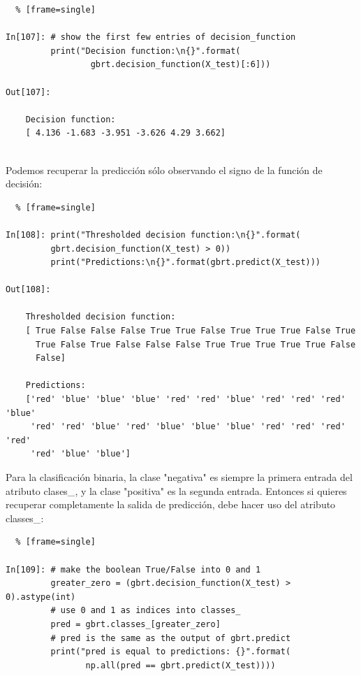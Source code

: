 {\begin{lstlisting}  % [frame=single]	

In[107]: # show the first few entries of decision_function
         print("Decision function:\n{}".format(
                 gbrt.decision_function(X_test)[:6]))
 
Out[107]:

    Decision function:
    [ 4.136 -1.683 -3.951 -3.626 4.29 3.662]
    
\end{lstlisting}


\noindent Podemos recuperar la predicción  sólo observando el signo de la función de decisión:\\
 
	\begin{lstlisting}  % [frame=single]	

In[108]: print("Thresholded decision function:\n{}".format(
         gbrt.decision_function(X_test) > 0))
         print("Predictions:\n{}".format(gbrt.predict(X_test)))

Out[108]:

    Thresholded decision function:
    [ True False False False True True False True True True False True
      True False True False False False True True True True True False
      False]

    Predictions:
    ['red' 'blue' 'blue' 'blue' 'red' 'red' 'blue' 'red' 'red' 'red' 'blue'
     'red' 'red' 'blue' 'red' 'blue' 'blue' 'blue' 'red' 'red' 'red' 'red'
     'red' 'blue' 'blue']

\end{lstlisting} 


Para la clasificación binaria, la clase "negativa"{ }   es siempre la primera entrada del atributo {\ttfamily clases\_}, y la clase "positiva"{ }  es la segunda entrada. Entonces si quieres recuperar completamente la salida de predicción, debe hacer uso del atributo {\ttfamily classes\_}:\\

	\begin{lstlisting}  % [frame=single]	

In[109]: # make the boolean True/False into 0 and 1
         greater_zero = (gbrt.decision_function(X_test) > 0).astype(int)
         # use 0 and 1 as indices into classes_
         pred = gbrt.classes_[greater_zero]
         # pred is the same as the output of gbrt.predict
         print("pred is equal to predictions: {}".format(
                np.all(pred == gbrt.predict(X_test))))


\end{lstlisting}}
